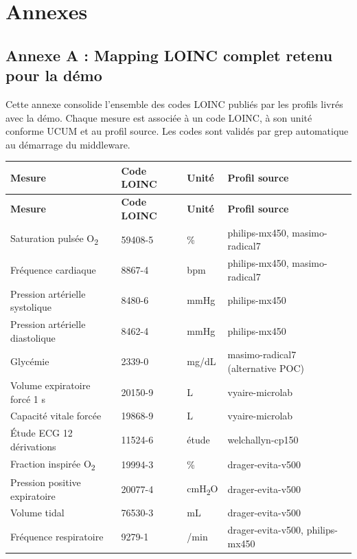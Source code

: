 \appendix
\chapter{Annexes}
\label{ch:annexes}

\section*{Annexe A : Mapping LOINC complet retenu pour la démo}
\label{sec:annexe-loinc}

Cette annexe consolide l'ensemble des codes LOINC publiés par les profils livrés avec la démo. Chaque mesure est associée à un code LOINC, à son unité conforme UCUM et au profil source. Les codes sont validés par grep automatique au démarrage du middleware.

\bridgezebra
\begin{longtable}{p{5.5cm}p{2cm}p{2cm}p{4.5cm}}
  \toprule
  \rowcolor{bridgeblue!90}
  {\color{white}\bfseries Mesure} & {\color{white}\bfseries Code LOINC} & {\color{white}\bfseries Unité} & {\color{white}\bfseries Profil source} \\
  \midrule
  \endfirsthead
  \toprule
  \rowcolor{bridgeblue!90}
  {\color{white}\bfseries Mesure} & {\color{white}\bfseries Code LOINC} & {\color{white}\bfseries Unité} & {\color{white}\bfseries Profil source} \\
  \midrule
  \endhead
  \bottomrule
  \endfoot
  Saturation pulsée O\textsubscript{2} & 59408-5 & \% & philips-mx450, masimo-radical7 \\
  Fréquence cardiaque & 8867-4 & bpm & philips-mx450, masimo-radical7 \\
  Pression artérielle systolique & 8480-6 & mmHg & philips-mx450 \\
  Pression artérielle diastolique & 8462-4 & mmHg & philips-mx450 \\
  Glycémie & 2339-0 & mg/dL & masimo-radical7 (alternative POC) \\
  Volume expiratoire forcé 1 s & 20150-9 & L & vyaire-microlab \\
  Capacité vitale forcée & 19868-9 & L & vyaire-microlab \\
  Étude ECG 12 dérivations & 11524-6 & étude & welchallyn-cp150 \\
  Fraction inspirée O\textsubscript{2} & 19994-3 & \% & drager-evita-v500 \\
  Pression positive expiratoire & 20077-4 & cmH\textsubscript{2}O & drager-evita-v500 \\
  Volume tidal & 76530-3 & mL & drager-evita-v500 \\
  Fréquence respiratoire & 9279-1 & /min & drager-evita-v500, philips-mx450 \\
\end{longtable}

